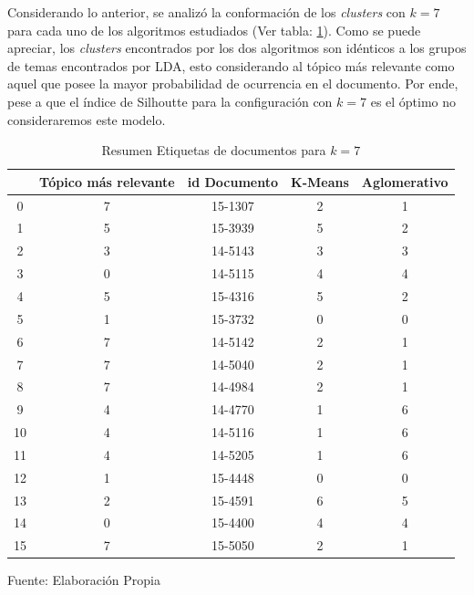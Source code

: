     Considerando lo anterior, se analizó la conformación de los \textit{clusters} con $k=7$ para cada uno de los algoritmos estudiados (Ver tabla: \ref{table:Cluster_Etiquetas}). Como se puede apreciar, los \textit{clusters} encontrados por los dos algoritmos son idénticos a los grupos de temas encontrados por LDA, esto considerando al tópico más relevante como aquel que posee la mayor probabilidad de ocurrencia en el documento. Por ende, pese a que el índice de Silhoutte para la configuración con $k=7$ es el óptimo no consideraremos este modelo. 
    \begin{table}[H]
    \centering
\begin{tabular}{|c|c|c|c|c|}
\hline
   & Tópico más relevante & id Documento & K-Means & Aglomerativo \\ \hline
0  & 7                    & 15-1307      & 2       & 1            \\ \hline
1  & 5                    & 15-3939      & 5       & 2            \\ \hline
2  & 3                    & 14-5143      & 3       & 3            \\ \hline
3  & 0                    & 14-5115      & 4       & 4            \\ \hline
4  & 5                    & 15-4316      & 5       & 2            \\ \hline
5  & 1                    & 15-3732      & 0       & 0            \\ \hline
6  & 7                    & 14-5142      & 2       & 1            \\ \hline
7  & 7                    & 14-5040      & 2       & 1            \\ \hline
8  & 7                    & 14-4984      & 2       & 1            \\ \hline
9  & 4                    & 14-4770      & 1       & 6            \\ \hline
10 & 4                    & 14-5116      & 1       & 6            \\ \hline
11 & 4                    & 14-5205      & 1       & 6            \\ \hline
12 & 1                    & 15-4448      & 0       & 0            \\ \hline
13 & 2                    & 15-4591      & 6       & 5            \\ \hline
14 & 0                    & 15-4400      & 4       & 4            \\ \hline
15 & 7                    & 15-5050      & 2       & 1            \\ \hline
\end{tabular}
    \caption{\label{table:Cluster_Etiquetas} Resumen Etiquetas de documentos para $k=7$} Fuente: Elaboración Propia
\end{table}
    
